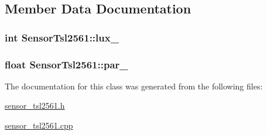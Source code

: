 \subsection{Member Data Documentation}
\hypertarget{class_sensor_tsl2561_ae12c0a6210834b63eb786e81043c38c4}{}
\subsubsection[{lux\+\_\+}]{\setlength{\rightskip}{0pt plus 5cm}int Sensor\+Tsl2561\+::lux\+\_\+}\label{class_sensor_tsl2561_ae12c0a6210834b63eb786e81043c38c4}
\hypertarget{class_sensor_tsl2561_a1159f0229bf7cfc07da35366f81661f7}{}
\subsubsection[{par\+\_\+}]{\setlength{\rightskip}{0pt plus 5cm}float Sensor\+Tsl2561\+::par\+\_\+}\label{class_sensor_tsl2561_a1159f0229bf7cfc07da35366f81661f7}


The documentation for this class was generated from the following files\+:\begin{DoxyCompactItemize}
\item 
\hyperlink{sensor__tsl2561_8h}{sensor\+\_\+tsl2561.\+h}\item 
\hyperlink{sensor__tsl2561_8cpp}{sensor\+\_\+tsl2561.\+cpp}\end{DoxyCompactItemize}

